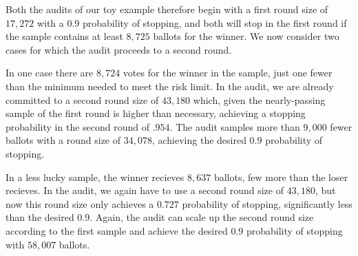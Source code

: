 Both the audits of our toy example therefore begin with a first round size of $17,272$ with a $0.9$ probability of stopping, and both will stop in the first round if the sample contains at least $8,725$ ballots for the winner. We now consider two cases for which the audit proceeds to a second round. 
\begin{description}
\item In one case there are $8,724$ votes for the winner in the sample, just one fewer than the minimum needed to meet the risk limit. In the \Minerva audit, we are already committed to a second round size of $43,180$ which, given the nearly-passing sample of the first round is higher than necessary, achieving a stopping probability in the second round of $.954$. The \Providence audit samples more than $9,000$ fewer ballots with a round size of $34,078$, achieving the desired $0.9$ probability of stopping.
\item In a less lucky sample, the winner recieves $8,637$ ballots, few more than the loser recieves. In the \Minerva audit, we again have to use a second round size of $43,180$, but now this round size only achieves a $0.727$ probability of stopping, significantly less than the desired $0.9$. Again, the \Providence audit can scale up the second round size according to the first sample and achieve the desired $0.9$ probability of stopping with $58,007$ ballots.
\end{description}







% 
% 

